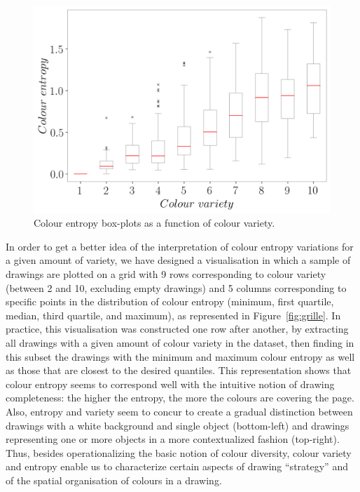 \documentclass[11pt,a4paper]{article}
\begin{document}
\begin{figure}[h!]
	\centering
	\includegraphics[width=\linewidth]{figures/colors-boxplot.png}
	\caption{Colour entropy box-plots as a function of colour variety.}
	\label{fig:entropy_boxplot}
\end{figure}

In order to get a better idea of the interpretation of colour entropy variations for a given amount of variety, we have designed a visualisation in which a sample of drawings are plotted on a grid with 9 rows corresponding to colour variety (between 2 and 10, excluding empty drawings) and 5 columns corresponding to specific points in the distribution of colour entropy (minimum, first quartile, median, third quartile, and maximum), as represented in Figure~\ref{fig:grille}. In practice, this visualisation was constructed one row after another, by extracting all drawings with a given amount of colour variety in the dataset, then finding in this subset the drawings with the minimum and maximum colour entropy as well as those that are closest to the desired quantiles. This representation shows that colour entropy seems to correspond well with the intuitive notion of drawing completeness: the higher the entropy, the more the colours are covering the page. Also, entropy and variety seem to concur to create a gradual distinction between drawings with a white background and single object (bottom-left) and drawings representing one or more objects in a more contextualized fashion (top-right). Thus, besides operationalizing the basic notion of colour diversity, colour variety and entropy enable us to characterize certain aspects of drawing ``strategy'' and of the spatial organisation of colours in a drawing.
\end{document}
